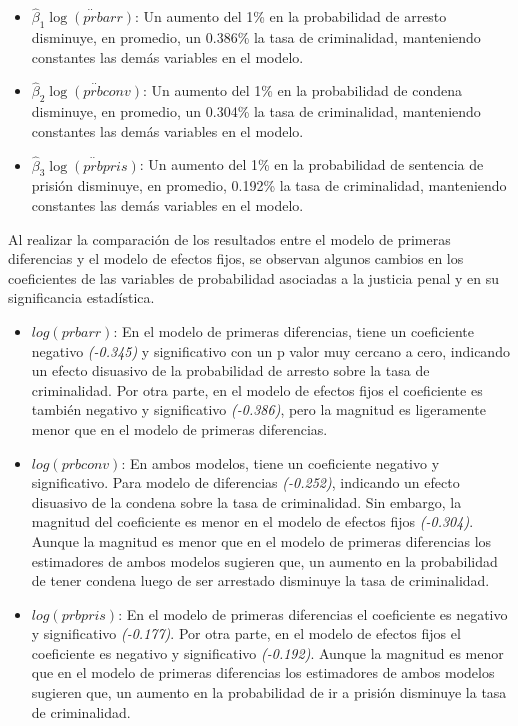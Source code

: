 \documentclass[
  12pt,
]{article}
\begin{document}
\begin{itemize}
\item
  \(\hat{\beta}_1\stackrel{..}{\log(prbarr)}\): Un aumento del 1\% en la
  probabilidad de arresto disminuye, en promedio, un 0.386\% la tasa de
  criminalidad, manteniendo constantes las demás variables en el modelo.
\item
  \(\hat{\beta}_2\stackrel{..}{\log(prbconv)}\): Un aumento del 1\% en
  la probabilidad de condena disminuye, en promedio, un 0.304\% la tasa
  de criminalidad, manteniendo constantes las demás variables en el
  modelo.
\item
  \(\hat{\beta}_3\stackrel{..}{\log(prbpris)}\): Un aumento del 1\% en
  la probabilidad de sentencia de prisión disminuye, en promedio,
  0.192\% la tasa de criminalidad, manteniendo constantes las demás
  variables en el modelo.
\end{itemize}

Al realizar la comparación de los resultados entre el modelo de primeras
diferencias y el modelo de efectos fijos, se observan algunos cambios en
los coeficientes de las variables de probabilidad asociadas a la
justicia penal y en su significancia estadística.

\begin{itemize}
\item
  \(log(prbarr)\): En el modelo de primeras diferencias, tiene un
  coeficiente negativo \emph{(-0.345)} y significativo con un p valor
  muy cercano a cero, indicando un efecto disuasivo de la probabilidad
  de arresto sobre la tasa de criminalidad. Por otra parte, en el modelo
  de efectos fijos el coeficiente es también negativo y significativo
  \emph{(-0.386)}, pero la magnitud es ligeramente menor que en el
  modelo de primeras diferencias.
\item
  \(log(prbconv)\): En ambos modelos, tiene un coeficiente negativo y
  significativo. Para modelo de diferencias \emph{(-0.252)}, indicando
  un efecto disuasivo de la condena sobre la tasa de criminalidad. Sin
  embargo, la magnitud del coeficiente es menor en el modelo de efectos
  fijos \emph{(-0.304)}. Aunque la magnitud es menor que en el modelo de
  primeras diferencias los estimadores de ambos modelos sugieren que, un
  aumento en la probabilidad de tener condena luego de ser arrestado
  disminuye la tasa de criminalidad.
\item
  \(log(prbpris)\): En el modelo de primeras diferencias el coeficiente
  es negativo y significativo \emph{(-0.177)}. Por otra parte, en el
  modelo de efectos fijos el coeficiente es negativo y significativo
  \emph{(-0.192)}. Aunque la magnitud es menor que en el modelo de
  primeras diferencias los estimadores de ambos modelos sugieren que, un
  aumento en la probabilidad de ir a prisión disminuye la tasa de
  criminalidad.
\end{itemize}
\end{document}
